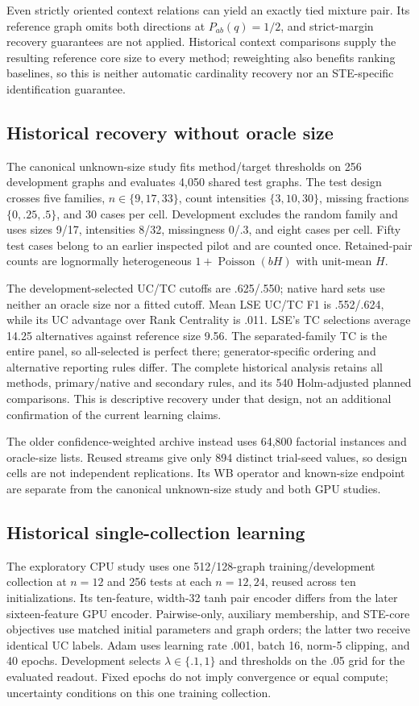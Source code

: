 Even strictly oriented context relations can yield an exactly tied mixture pair. Its reference graph omits both directions at $P_{ab}(q)=1/2$, and strict-margin recovery guarantees are not applied. Historical context comparisons supply the resulting reference core size to every method; reweighting also benefits ranking baselines, so this is neither automatic cardinality recovery nor an STE-specific identification guarantee.

\subsection{Historical recovery without oracle size}\label{app:newcontrolled}\label{sec:unknown}
The canonical unknown-size study fits method/target thresholds on 256 development graphs and evaluates 4,050 shared test graphs. The test design crosses five families, $n\in\{9,17,33\}$, count intensities $\{3,10,30\}$, missing fractions $\{0,.25,.5\}$, and 30 cases per cell. Development excludes the random family and uses sizes 9/17, intensities 8/32, missingness 0/.3, and eight cases per cell. Fifty test cases belong to an earlier inspected pilot and are counted once. Retained-pair counts are lognormally heterogeneous $1+\operatorname{Poisson}(bH)$ with unit-mean $H$.

The development-selected UC/TC cutoffs are .625/.550; native hard sets use neither an oracle size nor a fitted cutoff. Mean LSE UC/TC F1 is .552/.624, while its UC advantage over Rank Centrality is .011. LSE's TC selections average 14.25 alternatives against reference size 9.56. The separated-family TC is the entire panel, so all-selected is perfect there; generator-specific ordering and alternative reporting rules differ. The complete historical analysis retains all methods, primary/native and secondary rules, and its 540 Holm-adjusted planned comparisons. This is descriptive recovery under that design, not an additional confirmation of the current learning claims.

The older confidence-weighted archive instead uses 64,800 factorial instances and oracle-size lists. Reused streams give only 894 distinct trial-seed values, so design cells are not independent replications. Its WB operator and known-size endpoint are separate from the canonical unknown-size study and both GPU studies.

\subsection{Historical single-collection learning}\label{app:newlearning}
The exploratory CPU study uses one 512/128-graph training/development collection at $n=12$ and 256 tests at each $n=12,24$, reused across ten initializations. Its ten-feature, width-32 tanh pair encoder differs from the later sixteen-feature GPU encoder. Pairwise-only, auxiliary membership, and STE-core objectives use matched initial parameters and graph orders; the latter two receive identical UC labels. Adam uses learning rate .001, batch 16, norm-5 clipping, and 40 epochs. Development selects $\lambda\in\{.1,1\}$ and thresholds on the .05 grid for the evaluated readout. Fixed epochs do not imply convergence or equal compute; uncertainty conditions on this one training collection.

